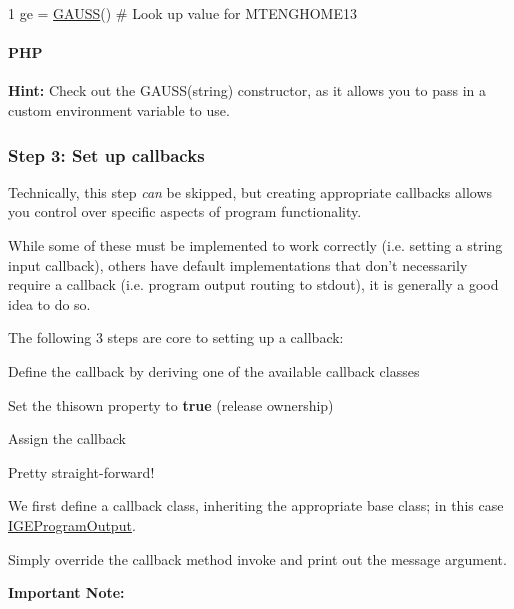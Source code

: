 \begin{DoxyCode}
1 ge = \hyperlink{class_g_a_u_s_s}{GAUSS}()  \textcolor{comment}{# Look up value for MTENGHOME13}
\end{DoxyCode}
 \paragraph*{P\-H\-P}




{\bfseries Hint\-:} Check out the {\ttfamily G\-A\-U\-S\-S(string)} constructor, as it allows you to pass in a custom environment variable to use.

\subsubsection*{Step 3\-: Set up callbacks}

Technically, this step {\itshape can} be skipped, but creating appropriate callbacks allows you control over specific aspects of program functionality.

While some of these must be implemented to work correctly (i.\-e. setting a string input callback), others have default implementations that don't necessarily require a callback (i.\-e. program output routing to {\ttfamily stdout}), it is generally a good idea to do so.

The following 3 steps are core to setting up a callback\-:
\begin{DoxyEnumerate}
\item Define the callback by deriving one of the available callback classes
\item Set the {\ttfamily thisown} property to {\bfseries true} (release ownership)
\item Assign the callback
\end{DoxyEnumerate}

Pretty straight-\/forward!

We first define a callback class, inheriting the appropriate base class; in this case \hyperlink{class_i_g_e_program_output}{I\-G\-E\-Program\-Output}.

Simply override the callback method {\ttfamily invoke} and print out the {\ttfamily message} argument.

{\bfseries Important Note\-:}

